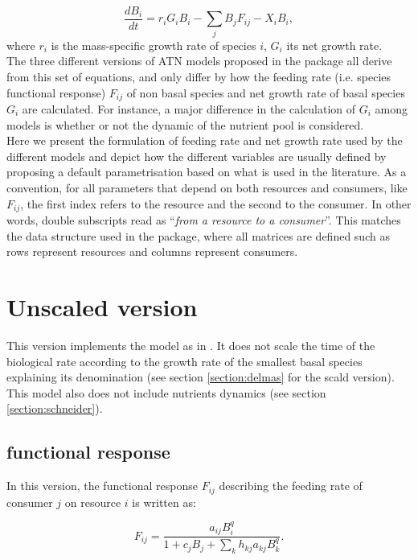 \documentclass[12pt,a4paper]{article}
\begin{document}
\begin{equation}
\frac{dB_i}{dt} = r_iG_iB_i - \sum_{j}B_jF_{ij} - X_iB_i,
\end{equation}
where $r_i$ is the mass-specific growth rate of species $i$, $G_i$ its net growth rate. \\

The three different versions of ATN models proposed in the package all derive from this set of equations, and only differ by how the feeding rate (i.e. species functional response) $F_{ij}$ of non basal species and net growth rate of basal species $G_i$ are calculated. For instance, a major difference in the calculation of $G_i$ among models is whether or not the dynamic of the nutrient pool is considered.\\
Here we present the formulation of feeding rate and net growth rate used by the different models and depict how the different variables are usually defined  by proposing a default parametrisation based on what is used in the literature. As a convention, for all parameters that depend on both resources and consumers, like $F_{ij}$, the first index refers to the resource and the second to the consumer. In other words, double subscripts read as ``\textit{from a resource to a consumer}''. This matches the data structure used in the package, where all matrices are defined such as rows represent resources and columns represent consumers.  
\\


\section{Unscaled version}
\label{section:binzer}

This version implements the model as in \cite{binzer2016interactive}. It does not scale the time of the biological rate according to the growth rate of the smallest basal species explaining its denomination (see section \ref{section:delmas} for the scald version). This model also does not include nutrients dynamics (see section \ref{section:schneider}).

\subsection{functional response}
In this version, the functional response $F_{ij}$ describing the feeding rate of consumer $j$ on resource $i$ is written as:

\begin{equation}
F_{ij} = \frac{a_{ij}B_i^q}{1 + c_jB_j + \sum_kh_{kj}a_{kj}B_k^q}.
\end{equation}
\end{document}
